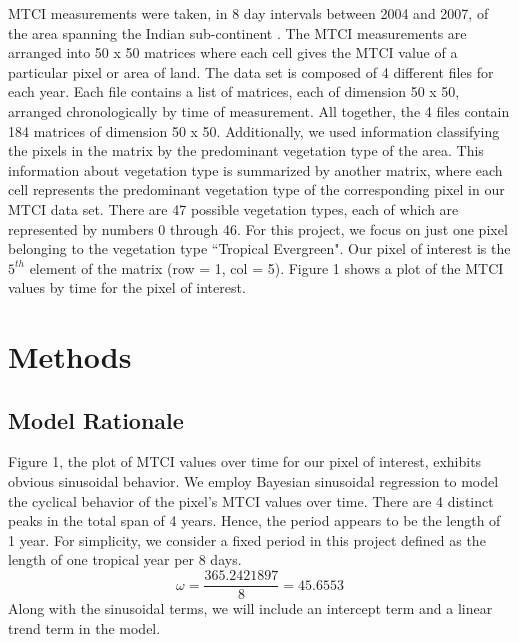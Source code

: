 \documentclass[12pt, a4paper]{article}
\begin{document}
MTCI measurements were taken, in 8 day intervals between 2004 and 2007, of the area spanning the Indian sub-continent \cite{dash}. The MTCI measurements are arranged into 50 x 50 matrices where each cell gives the MTCI value of a particular pixel or area of land. The data set is composed of 4 different files for each year. Each file contains a list of matrices, each of dimension 50 x 50, arranged chronologically by time of measurement. All together, the 4 files contain 184 matrices of dimension 50 x 50. Additionally, we used information classifying the pixels in the matrix by the predominant vegetation type of the area. This information about vegetation type is summarized by another matrix, where each cell represents the predominant vegetation type of the corresponding pixel in our MTCI data set. There are 47 possible vegetation types, each of which are represented by numbers 0 through 46. For this project, we focus on just one pixel belonging to the vegetation type ``Tropical Evergreen". Our pixel of interest is the $5^{th}$ element of the matrix (row = 1, col = 5). Figure 1 shows a plot of the MTCI values by time for the pixel of interest.                        

\section{Methods}

\subsection{Model Rationale}
\qquad Figure 1, the plot of MTCI values over time for our pixel of interest, exhibits obvious sinusoidal behavior. We employ Bayesian sinusoidal regression to model the cyclical behavior of the pixel's MTCI values over time. There are 4 distinct peaks in the total span of 4 years. Hence, the period appears to be the length of 1 year. For simplicity, we consider a fixed period in this project defined as the length of one tropical year per 8 days.
\begin{equation}
\omega = \frac{365.2421897}{8} = 45.6553
\end{equation}
Along with the sinusoidal terms, we will include an intercept term and a linear trend term in the model.
\end{document}

